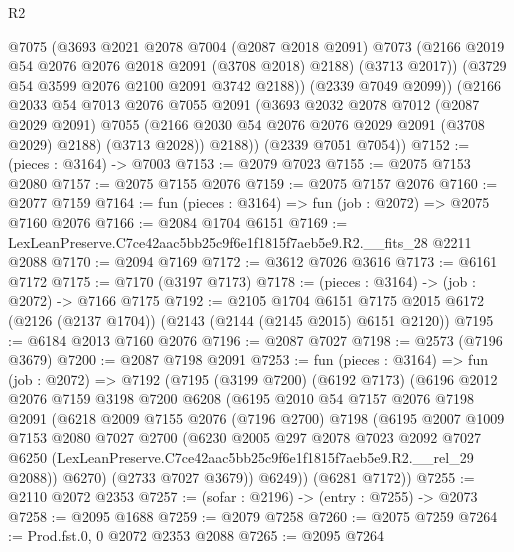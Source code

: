 \begin{lexlean}{R2}
\begin{coremodule}
            @7075
            (@3693
              @2021
              @2078
              @7004
              (@2087 @2018 @2091)
              @7073
              (@2166 @2019 @54 @2076 @2076 @2018 @2091 (@3708 @2018) @2188)
              (@3713 @2017))
            (@3729 @54 @3599 @2076 @2100 @2091 @3742 @2188))
          (@2339 @7049 @2099))
        (@2166
          @2033
          @54
          @7013
          @2076
          @7055
          @2091
          (@3693
            @2032
            @2078
            @7012
            (@2087 @2029 @2091)
            @7055
            (@2166 @2030 @54 @2076 @2076 @2029 @2091 (@3708 @2029) @2188)
            (@3713 @2028))
          @2188))
      (@2339 @7051 @7054))
@7152 := (pieces : @3164) -> @7003
@7153 := @2079 @7023
@7155 := @2075 @7153 @2080
@7157 := @2075 @7155 @2076
@7159 := @2075 @7157 @2076
@7160 := @2077 @7159
@7164 := fun (pieces : @3164) => fun (job : @2072) => @2075 @7160 @2076
@7166 := @2084 @1704 @6151
@7169 := LexLeanPreserve.C7ce42aac5bb25c9f6e1f1815f7aeb5e9.R2.__fits_28 @2211 @2088
@7170 := @2094 @7169
@7172 := @3612 @7026 @3616
@7173 := @6161 @7172
@7175 := @7170 (@3197 @7173)
@7178 := (pieces : @3164) -> (job : @2072) -> @7166 @7175
@7192 := @2105
    @1704
    @6151
    @7175
    @2015
    @6172
    (@2126 (@2137 @1704))
    (@2143 (@2144 (@2145 @2015) @6151 @2120))
@7195 := @6184 @2013 @7160 @2076
@7196 := @2087 @7027
@7198 := @2573 (@7196 @3679)
@7200 := @2087 @7198 @2091
@7253 := fun (pieces : @3164) =>
  fun (job : @2072) =>
  @7192
    (@7195
      (@3199 @7200)
      (@6192 @7173)
      (@6196
        @2012
        @2076
        @7159
        @3198
        @7200
        @6208
        (@6195
          @2010
          @54
          @7157
          @2076
          @7198
          @2091
          (@6218
            @2009
            @7155
            @2076
            (@7196 @2700)
            @7198
            (@6195
              @2007
              @1009
              @7153
              @2080
              @7027
              @2700
              (@6230
                @2005
                @297
                @2078
                @7023
                @2092
                @7027
                @6250
                (LexLeanPreserve.C7ce42aac5bb25c9f6e1f1815f7aeb5e9.R2.__rel_29 @2088))
              @6270)
            (@2733 @7027 @3679))
          @6249))
      (@6281 @7172))
@7255 := @2110 @2072 @2353
@7257 := (sofar : @2196) -> (entry : @7255) -> @2073
@7258 := @2095 @1688
@7259 := @2079 @7258
@7260 := @2075 @7259
@7264 := Prod.fst.{0, 0} @2072 @2353 @2088
@7265 := @2095 @7264

\end{coremodule}
\end{lexlean}

